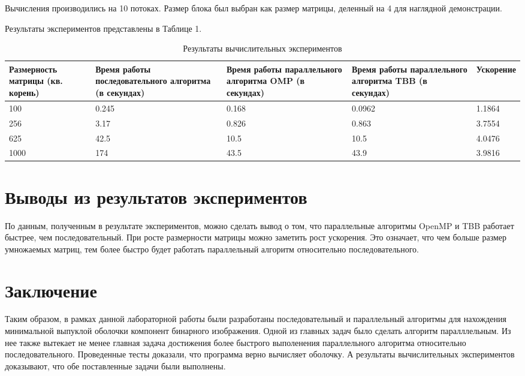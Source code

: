 \documentclass{report}
\begin{document}
\par Вычисления производились на 10 потоках. Размер блока был выбран как размер матрицы, деленный на 4 для наглядной демонстрации.

\par Результаты экспериментов представлены в Таблице 1.

\begin{table}[!h]
\caption{Результаты вычислительных экспериментов}
\centering
\begin{tabular}{| p{3cm} | p{3cm} | p{4cm} | p{4cm} | p{2cm} |}
\hline
Размерность матрицы (кв. корень) & Время работы последовательного алгоритма (в секундах) & Время работы параллельного алгоритма OMP (в секундах) & Время работы параллельного алгоритма TBB (в секундах) & Ускорение \\[5pt]
\hline
100     & 0.245 & 0.168   & 0.0962  & 1.1864       \\
256     & 3.17  & 0.826   & 0.863   & 3.7554       \\
625     & 42.5  & 10.5    & 10.5    & 4.0476       \\
1000    & 174   & 43.5    & 43.9    & 3.9816       \\
\hline
\end{tabular}
\end{table}

\newpage

\section*{Выводы из результатов экспериментов}
По данным, полученным в результате экспериментов, можно сделать вывод о том, что параллельные алгоритмы OpenMP и TBB работает быстрее, чем последовательный. При росте размерности матрицы можно заметить рост ускорения. Это означает, что чем больше размер умножаемых матриц,
тем более быстро будет работать параллельный алгоритм относительно последовательного.
\newpage

\section*{Заключение}
Таким образом, в рамках данной лабораторной работы были разработаны последовательный и параллельный алгоритмы для нахождения минимальной выпуклой оболочки компонент бинарного изображения. Одной из главных задач было сделать алгоритм паралллельным. Из нее также вытекает не менее главная задача достижения более быстрого выполенения параллельного алгоритма относительно последовательного. Проведенные тесты доказали, что программа верно вычисляет оболочку. А результаты вычислительных экспериментов доказывают, что обе поставленные задачи были выполнены.
\newpage
\end{document}
